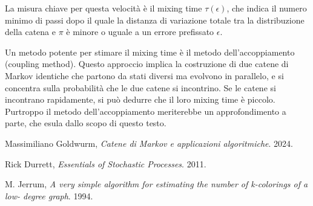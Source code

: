 \documentclass{article}
\begin{document}
La misura chiave per questa velocità è il mixing time $\tau(\epsilon)$, che indica il numero minimo di passi dopo il quale la distanza di variazione totale tra la distribuzione della catena e $\pi$ è minore o uguale a un errore prefissato $\epsilon$.

Un metodo potente per stimare il mixing time è il metodo dell'accoppiamento (coupling method). Questo approccio implica la costruzione di due catene di Markov identiche che partono da stati diversi ma evolvono in parallelo, e si concentra sulla probabilità che le due catene si incontrino. Se le catene si incontrano rapidamente, si può dedurre che il loro mixing time è piccolo.
Purtroppo il metodo dell’accoppiamento meriterebbe un approfondimento a parte, che esula dallo scopo di questo testo.

\begin{thebibliography}{9}

Massimiliano Goldwurm,
\textit{Catene di Markov e applicazioni algoritmiche}.
2024.

Rick Durrett,
\textit{Essentials of Stochastic Processes}.
2011.

M. Jerrum,
\textit{A very simple algorithm for estimating the number of k-colorings of a low-
degree graph}.
1994.


\end{thebibliography}
\end{document}
